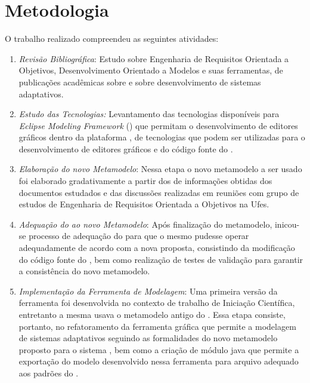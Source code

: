 \section{Metodologia}
\label{sec-intro-metodologia}

O trabalho realizado compreendeu as seguintes atividades:


\begin{enumerate}
	
	\item \textit{Revisão Bibliográfica}: Estudo sobre Engenharia de Requisitos Orientada a Objetivos, Desenvolvimento Orientado a Modelos e suas ferramentas, de publicações acadêmicas sobre \zanshin e sobre desenvolvimento de sistemas adaptativos. 
	
	\item \textit{Estudo das Tecnologias:} Levantamento das tecnologias disponíveis para \textit{Eclipse Modeling Framework} (\emf) que permitam o desenvolvimento de editores gráficos dentro da plataforma \eclipse, de tecnologias que podem ser utilizadas para o desenvolvimento de editores gráficos e do código fonte do \zanshin.
	
	\item \textit{Elaboração do novo Metamodelo}: Nessa etapa o novo metamodelo a ser usado foi elaborado gradativamente a partir dos de informações obtidas dos documentos estudados e das discussões realizadas em reuniões com grupo de estudos de Engenharia de Requisitos Orientada a Objetivos na Ufes.
	
	\item \textit{Adequação do \zanshin ao novo Metamodelo}: Após finalização do metamodelo, inicou-se processo de adequação do \framework para que o mesmo pudesse operar adequadamente de acordo com a nova proposta, consistindo da modificação do código fonte do \zanshin, bem como realização de testes de validação para garantir a consistência do novo metamodelo.
	
	\item \textit{Implementação da Ferramenta de Modelagem}: Uma primeira versão da ferramenta foi desenvolvida no contexto de trabalho de Iniciação Científica, entretanto a mesma usava o metamodelo antigo do \zanshin. Essa etapa consiste, portanto, no refatoramento da ferramenta gráfica que permite a modelagem de sistemas adaptativos seguindo as formalidades do novo metamodelo proposto para o sistema \zanshin, bem como a criação de módulo java que permite a exportação do modelo desenvolvido nessa ferramenta para arquivo \xml adequado aos padrões do \framework. 
	

\end{enumerate}
